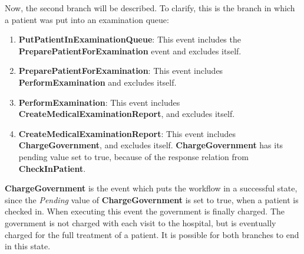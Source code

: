 Now, the second branch will be described. To clarify, this is the branch in which a patient was put into an examination queue:
\begin{enumerate}
\item \textbf{PutPatientInExaminationQueue}: This event includes the \textbf{PreparePatientForExamination} event and excludes itself.
\item \textbf{PreparePatientForExamination}: This event includes \textbf{PerformExamination} and excludes itself.
\item \textbf{PerformExamination}: This event includes \textbf{CreateMedicalExaminationReport}, and excludes itself.
\item \textbf{CreateMedicalExaminationReport}: This event includes \textbf{ChargeGovernment}, and excludes itself. \textbf{ChargeGovernment} has its pending value set to true, because of the response relation from \textbf{CheckInPatient}.
\end{enumerate}

\textbf{ChargeGovernment} is the event which puts the workflow in a successful state, since the \textit{Pending} value of \textbf{ChargeGovernment} is set to true, when a patient is checked in. When executing this event the government is finally charged. The government is not charged with each visit to the hospital, but is eventually charged for the full treatment of a patient. \newline
It is possible for both branches to end in this state.